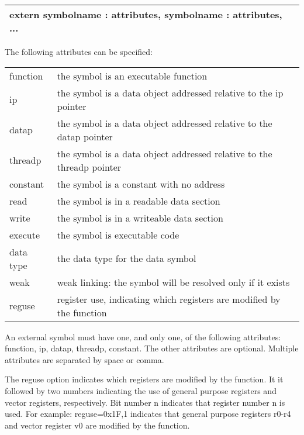 \documentclass[forwardcom.tex]{subfiles}
\begin{document}
\begin{tabular}{|p{150mm}|}
\hline
\hspace{4mm} extern symbolname : attributes, symbolname : attributes, ...\\
\hline
\end{tabular}
\vspace{2mm}

The following attributes can be specified:
\vspace{2mm}

\begin{tabular}{|p{20mm}p{130mm}|}
\hline
function & the symbol is an executable function\\
ip & the symbol is a data object addressed relative to the ip pointer\\
datap & the symbol is a data object addressed relative to the datap pointer\\
threadp & the symbol is a data object addressed relative to the threadp pointer\\
constant & the symbol is a constant with no address\\
read & the symbol is in a readable data section\\
write & the symbol is in a writeable data section\\
execute & the symbol is executable code\\
data type & the data type for the data symbol\\
weak & weak linking: the symbol will be resolved only if it exists\\
reguse & register use, indicating which registers are modified by the function\\
\hline
\end{tabular}
\vspace{2mm}

An external symbol must have one, and only one, of the following attributes: function, ip, datap, threadp, constant.
The other attributes are optional. Multiple attributes are separated by space or comma.
\vspace{2mm}

The reguse option indicates which registers are modified by the function. 
It it followed by two numbers indicating the use of general purpose registers and vector registers, respectively. Bit number n indicates that register number n is used. For example: reguse=0x1F,1 indicates that general purpose registers r0-r4 and vector register v0 are modified by the function.
\vspace{2mm}
\end{document}
